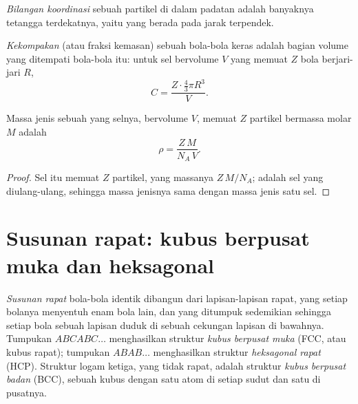 \begin{definition}\label{def:b1:crystals-metals:coordination}
\emph{Bilangan koordinasi} sebuah partikel di
dalam padatan adalah banyaknya tetangga terdekatnya, yaitu yang berada
pada jarak terpendek.
\end{definition}

\begin{definition}[Kekompakan]\label{def:b1:crystals-metals:compactness}
\emph{Kekompakan} (atau fraksi kemasan) sebuah 
bola-bola keras adalah bagian volume yang ditempati bola-bola itu: untuk
sel bervolume $V$ yang memuat $Z$ bola berjari-jari $R$,
\[
  C = \frac{Z \cdot \frac43 \pi R^3}{V} .
\]
\end{definition}

\begin{proposition}\label{prop:b1:crystals-metals:density}
Massa jenis sebuah  yang selnya, bervolume $V$, memuat $Z$
partikel bermassa molar $M$ adalah
\[
  \rho = \frac{Z\,M}{N_A\,V} .
\]
\end{proposition}

\begin{proof}
Sel itu memuat $Z$ partikel, yang massanya $Z\,M/N_A$;  adalah
sel yang diulang-ulang, sehingga massa jenisnya sama dengan massa jenis
satu sel.
\end{proof}

\section{Susunan rapat: kubus berpusat muka dan heksagonal}

\begin{definition}\label{def:b1:crystals-metals:packings}
\emph{Susunan rapat} bola-bola identik dibangun dari
lapisan-lapisan rapat, yang setiap bolanya menyentuh enam bola lain, dan
yang ditumpuk sedemikian sehingga setiap bola sebuah lapisan duduk di
sebuah cekungan lapisan di bawahnya. Tumpukan $ABCABC\dots$ menghasilkan
struktur \emph{kubus berpusat muka} (FCC, atau
kubus rapat); tumpukan $ABAB\dots$ menghasilkan struktur
\emph{heksagonal rapat} (HCP). Struktur logam
ketiga, yang tidak rapat, adalah struktur \emph{kubus berpusat
badan} (BCC), sebuah kubus dengan satu atom
di setiap sudut dan satu di pusatnya.
\end{definition}

